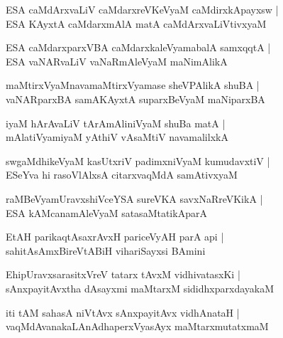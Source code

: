 \documentclass[twoside,12pt,openright]{book}
\newcounter{shloka}[chapter]
\begin{document}
\begin{shloka}%
ESA caMdArxvaLiV caMdarxreVKeVyaM caMdirxkApayxsw |\\
ESA KAyxtA caMdarxmAlA matA caMdArxvaLiVtivxyaM 
\end{shloka}

\begin{shloka}%
ESA caMdarxparxVBA caMdarxkaleVyamabalA samxqqtA |\\
ESA vaNARvaLiV vaNaRmAleVyaM maNimAlikA 
\end{shloka}

\begin{shloka}%
maMtirxVyaMnavamaMtirxVyamase sheVPAlikA shuBA |\\
vaNARparxBA samAKAyxtA suparxBeVyaM maNiparxBA 
\end{shloka}

\begin{shloka}%
iyaM hArAvaLiV tArAmAliniVyaM shuBa matA |\\
mAlatiVyamiyaM yAthiV vAsaMtiV navamalilxkA 
\end{shloka}

\begin{shloka}%
swgaMdhikeVyaM kasUtxriV padimxniVyaM kumudavxtiV |\\
ESeYva hi rasoVlAlxsA citarxvaqMdA samAtivxyaM 
\end{shloka}

\begin{shloka}%
raMBeVyamUravxshiVceYSA sureVKA savxNaRreVKikA |\\
ESA kAMcanamAleVyaM satasaMtatikAparA 
\end{shloka}

\begin{shloka}%
EtAH parikaqtAsaxrAvxH pariceVyAH parA api |\\
sahitAsAmxBireVtABiH vihariSayxsi BAmini
\end{shloka}

\begin{shloka}%
EhipUravxsarasitxVreV tatarx tAvxM vidhivatasxKi |\\
sAnxpayitAvxtha dAsayxmi maMtarxM sididhxparxdayakaM 
\end{shloka}

\begin{shloka}%
iti tAM sahasA niVtAvx sAnxpayitAvx vidhAnataH |\\
vaqMdAvanakaLAnAdhaperxVyasAyx maMtarxmutatxmaM 
\end{shloka}
\end{document}
